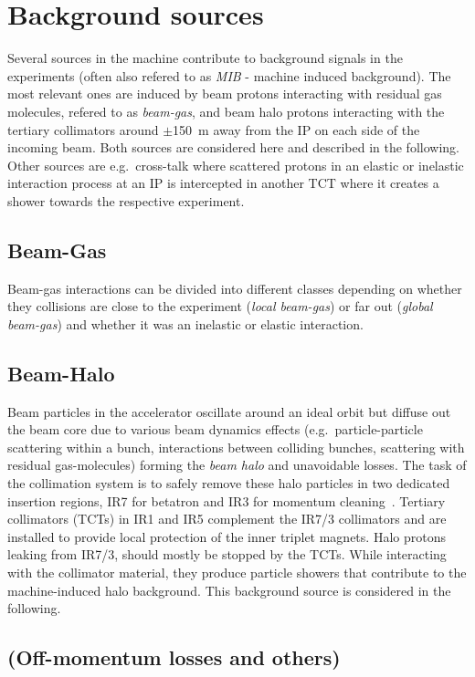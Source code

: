 \section{Background sources}
Several sources in the machine contribute to background signals in the experiments (often also refered to as \textit{MIB} - machine induced background). The most relevant ones are induced by beam protons interacting with residual gas molecules, refered to as \textit{beam-gas}, and beam halo protons interacting with the tertiary collimators around $\pm$150~m away from the IP on each side of the incoming beam. Both sources are considered here and described in the following. Other sources are e.g.~cross-talk where scattered protons in an elastic or inelastic interaction process at an IP is intercepted in another TCT where it creates a shower towards the respective experiment. 

\subsection{Beam-Gas}

Beam-gas interactions can be divided into different classes depending on whether they collisions are close to the experiment (\textit{local beam-gas}) or far out (\textit{global beam-gas}) and whether it was an inelastic or elastic interaction.

\subsection{Beam-Halo}
Beam particles in the accelerator oscillate around an ideal orbit but diffuse out the beam core due to various beam dynamics effects (e.g.~particle-particle scattering within a bunch, interactions between colliding bunches, scattering with residual gas-molecules) forming the \textit{beam halo} and unavoidable losses. The task of the collimation system is to safely remove these halo particles in two dedicated insertion regions, IR7 for betatron and IR3 for momentum cleaning~\cite{LHCDesignRep,collRef}. Tertiary collimators (TCTs) in IR1 and IR5 complement the IR7/3 collimators and are installed to provide local protection of the inner triplet magnets. Halo protons leaking from IR7/3, should mostly be stopped by the TCTs. While interacting with the collimator material, they produce particle showers that contribute to the machine-induced halo background. This background source is considered in the following.

\subsection{(Off-momentum losses and others)}

